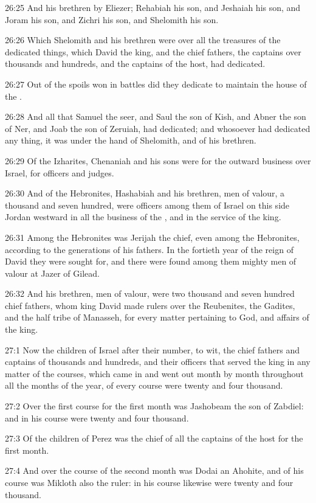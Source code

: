 26:25 And his brethren by Eliezer; Rehabiah his son, and Jeshaiah his son, and Joram his son, and Zichri his son, and Shelomith his son.

26:26 Which Shelomith and his brethren were over all the treasures of the dedicated things, which David the king, and the chief fathers, the captains over thousands and hundreds, and the captains of the host, had dedicated.

26:27 Out of the spoils won in battles did they dedicate to maintain the house of the \LORD.

26:28 And all that Samuel the seer, and Saul the son of Kish, and Abner the son of Ner, and Joab the son of Zeruiah, had dedicated; and whosoever had dedicated any thing, it was under the hand of Shelomith, and of his brethren.

26:29 Of the Izharites, Chenaniah and his sons were for the outward business over Israel, for officers and judges.

26:30 And of the Hebronites, Hashabiah and his brethren, men of valour, a thousand and seven hundred, were officers among them of Israel on this side Jordan westward in all the business of the \LORD, and in the service of the king.

26:31 Among the Hebronites was Jerijah the chief, even among the Hebronites, according to the generations of his fathers. In the fortieth year of the reign of David they were sought for, and there were found among them mighty men of valour at Jazer of Gilead.

26:32 And his brethren, men of valour, were two thousand and seven hundred chief fathers, whom king David made rulers over the Reubenites, the Gadites, and the half tribe of Manasseh, for every matter pertaining to God, and affairs of the king.

27:1 Now the children of Israel after their number, to wit, the chief fathers and captains of thousands and hundreds, and their officers that served the king in any matter of the courses, which came in and went out month by month throughout all the months of the year, of every course were twenty and four thousand.

27:2 Over the first course for the first month was Jashobeam the son of Zabdiel: and in his course were twenty and four thousand.

27:3 Of the children of Perez was the chief of all the captains of the host for the first month.

27:4 And over the course of the second month was Dodai an Ahohite, and of his course was Mikloth also the ruler: in his course likewise were twenty and four thousand.

